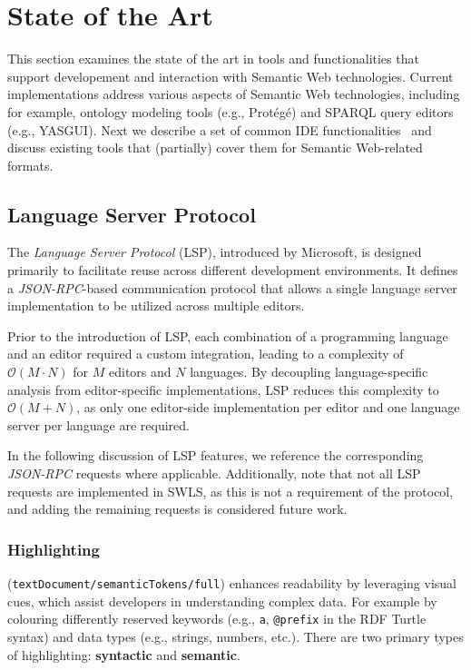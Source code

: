 
\section{State of the Art}%
\label{sec:related_work}

This section examines the state of the art in tools and functionalities that support developement and interaction with Semantic Web technologies. 
Current implementations address various aspects of Semantic Web technologies, including for example, ontology modeling tools (e.g., Protégé) and SPARQL query editors (e.g., YASGUI).
Next we describe a set of common IDE functionalities~\cite{HowAreJava} and discuss existing tools that (partially) cover them for Semantic Web-related formats.


\subsection{Language Server Protocol}


The \textit{Language Server Protocol} (LSP), introduced by Microsoft, is designed primarily to facilitate reuse across different development environments.
It defines a \textit{JSON-RPC}-based communication protocol that allows a single language server implementation to be utilized across multiple editors.

Prior to the introduction of LSP, each combination of a programming language and an editor required a custom integration, leading to a complexity of \(\mathcal{O}(M \cdot N)\) for \(M\) editors and \(N\) languages\cite{Kj_r_Rask_2021}.
By decoupling language-specific analysis from editor-specific implementations, LSP reduces this complexity to \(\mathcal{O}(M + N)\), as only one editor-side implementation per editor and one language server per language are required.

In the following discussion of LSP features, we reference the corresponding \textit{JSON-RPC} requests where applicable.
Additionally, note that not all LSP requests are implemented in SWLS, as this is not a requirement of the protocol, and adding the remaining requests is considered future work.


\subsubsection{Highlighting} (\texttt{textDocument/semanticTokens/full}) enhances readability by leveraging visual cues, which assist developers in understanding complex data.
For example by colouring differently reserved keywords (e.g., \texttt{a}, \texttt{@prefix} in the RDF Turtle syntax) and data types (e.g., strings, numbers, etc.).  
There are two primary types of highlighting: \textbf{syntactic} and \textbf{semantic}.

